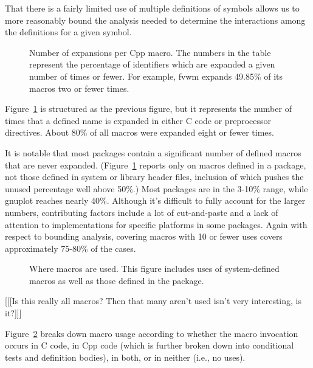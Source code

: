 \documentclass[11pt]{article}
\begin{document}
That there is a fairly limited use of multiple definitions of symbols
allows us to more reasonably bound the analysis needed to determine
the interactions among the definitions for a given symbol.

\begin{figure}
\centerline{}
\caption{Number of expansions per Cpp macro.  The numbers in the
  table represent the percentage of identifiers which are expanded a given
  number of times or fewer.  For example, fvwm expands 49.85\% of its
  macros two or fewer times.}
\label{fig:freq-use}
\end{figure}

Figure~\ref{fig:freq-use} is structured as the previous figure, but it
represents the number of times that a defined name is expanded in either C
code or preprocessor directives.  About 80\% of all macros were expanded
eight or fewer times.

It is notable that most packages contain a significant number of defined
macros that are never expanded.  (Figure~\ref{fig:freq-use} reports only
on macros defined in a package, not those defined in system or library
header files, inclusion of which pushes the unused percentage well above 50\%.)
Most packages are in the 3-10\% range, while gnuplot
reaches nearly 40\%.  Although it's difficult to fully account for the
larger numbers, contributing factors include a lot of cut-and-paste
and a lack of attention to implementations for specific platforms in
some packages.  Again with respect to bounding analysis, covering
macros with 10 or fewer uses covers approximately 75-80\% of the cases.

\begin{figure}
\centerline{}
\caption{Where macros are used.  This figure includes uses of
  system-defined macros as well as those defined in the package.}
\label{fig:where-used}
\end{figure}

[[[Is this really all macros?  Then that many aren't used isn't very
interesting, is it?]]]

Figure~\ref{fig:where-used} breaks down macro usage according to whether
the macro invocation occurs in C code, in Cpp code (which is further broken
down into conditional tests and definition bodies), in both, or in neither
(i.e., no uses).  
\end{document}
